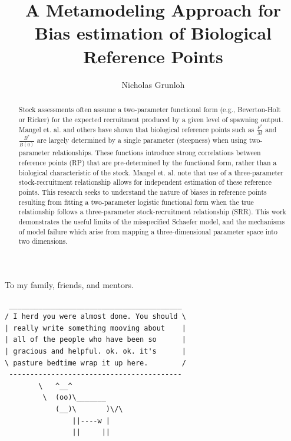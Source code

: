 \documentclass[12pt]{ucscthesis}
\title{A Metamodeling Approach for Bias estimation of Biological Reference Points}
\author{Nicholas Grunloh}
\begin{document}
%
\begin{frontmatter}

%
\maketitle
\copyrightpage
%
\tableofcontents
\listoffigures

%
\begin{abstract}
Stock assessments often assume a two-parameter functional form
(e.g., Beverton-Holt or Ricker) for the expected recruitment produced by a
given level of spawning output. Mangel et. al. \cite{mangel_perspective_2013} %
and others have shown that biological reference points such as $\frac{F^*}{M}$
and $\frac{B^*}{\bar{B}(0)}$ are largely determined by a single parameter
(steepness) when using two-parameter relationships. These functions introduce
strong correlations between reference points (RP) that are pre-determined by
the functional form, rather than a biological characteristic of the stock.
Mangel et. al. note that use of a three-parameter stock-recruitment
relationship allows for independent estimation of these reference points. This
research seeks to understand the nature of biases in reference points
resulting from fitting a two-parameter logistic functional form when the true
relationship follows a three-parameter stock-recruitment relationship (SRR). This  %
work demonstrates the useful limits of the misspecified Schaefer model, and
the mechanisms of model failure which arise from mapping a three-dimensional
parameter space into two dimensions.
\end{abstract}

%
\begin{dedication}
\null\vfil
{\large 
\begin{center}
To my family, friends, and mentors.
\end{center}}
\vfil\null
\end{dedication}

%
\begin{acknowledgements}
\color{red}
\begin{verbatim}
 _________________________________________ 
/ I herd you were almost done. You should \
| really write something mooving about    |
| all of the people who have been so      |
| gracious and helpful. ok. ok. it's      |
\ pasture bedtime wrap it up here.        /
 ----------------------------------------- 
        \   ^__^
         \  (oo)\_______
            (__)\       )\/\
                ||----w |
                ||     ||
\end{verbatim}


\end{acknowledgements}
\end{frontmatter}
\end{document}
